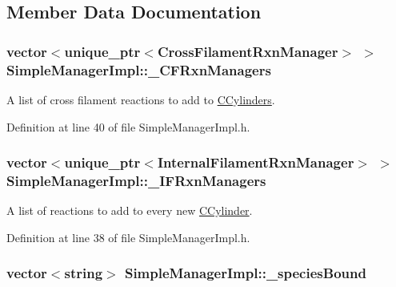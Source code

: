 \subsection{Member Data Documentation}
\hypertarget{classSimpleManagerImpl_a62c7e79906c431487c9c97474c6aab6e}{
\subsubsection[{\+\_\+\+C\+F\+Rxn\+Managers}]{\setlength{\rightskip}{0pt plus 5cm}vector$<$unique\+\_\+ptr$<${\bf Cross\+Filament\+Rxn\+Manager}$>$ $>$ Simple\+Manager\+Impl\+::\+\_\+\+C\+F\+Rxn\+Managers\hspace{0.3cm}{\ttfamily [private]}}}\label{classSimpleManagerImpl_a62c7e79906c431487c9c97474c6aab6e}


A list of cross filament reactions to add to \hyperlink{classCCylinder}{C\+Cylinders}. 



Definition at line 40 of file Simple\+Manager\+Impl.\+h.

\hypertarget{classSimpleManagerImpl_a577d86758aa99cd7ebf965872dfce50f}{
\subsubsection[{\+\_\+\+I\+F\+Rxn\+Managers}]{\setlength{\rightskip}{0pt plus 5cm}vector$<$unique\+\_\+ptr$<${\bf Internal\+Filament\+Rxn\+Manager}$>$ $>$ Simple\+Manager\+Impl\+::\+\_\+\+I\+F\+Rxn\+Managers\hspace{0.3cm}{\ttfamily [private]}}}\label{classSimpleManagerImpl_a577d86758aa99cd7ebf965872dfce50f}


A list of reactions to add to every new \hyperlink{classCCylinder}{C\+Cylinder}. 



Definition at line 38 of file Simple\+Manager\+Impl.\+h.

\hypertarget{classSimpleManagerImpl_ad09569aff7c98442037cd4b5e5fd1d4d}{
\subsubsection[{\+\_\+species\+Bound}]{\setlength{\rightskip}{0pt plus 5cm}vector$<$string$>$ Simple\+Manager\+Impl\+::\+\_\+species\+Bound\hspace{0.3cm}{\ttfamily [private]}}}\label{classSimpleManagerImpl_ad09569aff7c98442037cd4b5e5fd1d4d}


